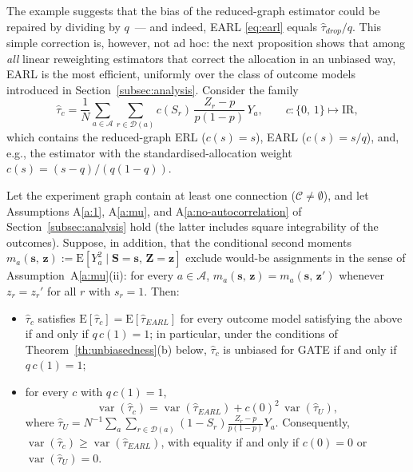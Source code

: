 \documentclass[sigconf,nonacm]{acmart}
\newcommand{\E}{\mathrm E}
\newcommand{\R}{\mathrm{I}\!\mathrm{R}}
\DeclareMathOperator{\var}{var}
\begin{document}
\medskip
The example suggests that the bias of the reduced-graph estimator could be repaired by dividing by $q$~--- and indeed, EARL \eqref{eq:earl} equals $\hat\tau_{drop}/q$. This simple correction is, however, not ad hoc: the next proposition shows that among \emph{all} linear reweighting estimators that correct the allocation in an unbiased way, EARL is the most efficient, uniformly over the class of outcome models introduced in Section~\ref{subsec:analysis}. Consider the family
\begin{equation}\label{eq:class}
    \hat\tau_{c} = \frac 1 N \sum_{a\in \mathcal A} \sum_{r\in\mathcal{D}(a)}c(S_r)\,\frac{Z_r - p}{p(1-p)}\, Y_a,\qquad c\colon\{0,\,1\}\mapsto\R,
\end{equation}
which contains the reduced-graph ERL ($c(s)=s$), EARL ($c(s)=s/q$), and, e.g., the estimator with the standardised-allocation weight $c(s)=(s-q)/(q(1-q))$.

\begin{proposition}\label{prop:optimality}
    Let the experiment graph contain at least one connection ($\mathcal C\neq\emptyset$), and let Assumptions A\ref{a:1}, A\ref{a:mu}, and A\ref{a:no-autocorrelation} of Section~\ref{subsec:analysis} hold (the latter includes square integrability of the outcomes). Suppose, in addition, that the conditional second moments $m_a(\mathbf s,\,\mathbf z) := \E[Y_a^2\mid \mathbf S=\mathbf s,\,\mathbf Z=\mathbf z]$ exclude would-be assignments in the sense of Assumption~A\ref{a:mu}(ii): for every $a\in\mathcal A$, $m_a(\mathbf s,\,\mathbf z) = m_a(\mathbf s,\,\mathbf z')$ whenever $z_r=z_r'$ for all $r$ with $s_r=1$. Then:
    \begin{itemize}
        \item[\textup{(a)}] $\hat\tau_c$ satisfies $\E[\hat\tau_c]=\E[\hat\tau_{EARL}]$ for every outcome model satisfying the above if and only if $q\,c(1)=1$; in particular, under the conditions of Theorem~\ref{th:unbiasedness}(b) below, $\hat\tau_c$ is unbiased for GATE if and only if $q\,c(1)=1$;
        \item[\textup{(b)}] for every $c$ with $q\,c(1)=1$,
        \begin{equation*}
        \var(\hat\tau_c) = \var(\hat\tau_{EARL}) + c(0)^2\,\var(\hat\tau_U),
        \end{equation*}
        where $\hat\tau_U = N^{-1}\sum_{a}\sum_{r\in\mathcal D(a)}(1-S_r)\frac{Z_r-p}{p(1-p)}Y_a$. Consequently, $\var(\hat\tau_c) \ge \var(\hat\tau_{EARL})$, with equality if and only if $c(0)=0$ or $\var(\hat\tau_U)=0$.
    \end{itemize}
\end{proposition}
\end{document}
